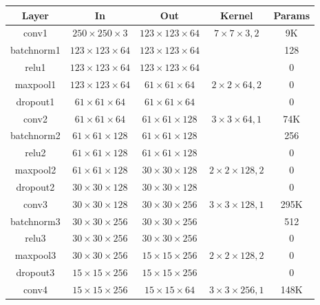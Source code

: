 \documentclass{article}
\newcommand{\B}[1]{\textbf{#1}}
\begin{document}
\begin{sloppypar}
    \begin{center}
        \begin{table}[!h]
            \begin{tabular}{|c|c|c|c|c|}
                \hline
                \B{Layer} & \B{In} & \B{Out} & \B{Kernel} & \B{Params}\\
                \hline \hline
                conv1 & $250\times 250\times 3$ & $123\times 123\times 64$ & $7\times 7\times 3, 2$ & 9K\\
                batchnorm1 & $123\times 123\times 64$ & $123\times 123\times 64$ & & 128\\
                relu1 & $123\times 123\times 64$ & $123\times 123\times 64$ & & 0\\
                maxpool1 & $123\times 123\times 64$ & $61\times 61\times 64$ & $2\times 2\times 64, 2$ & 0\\
                dropout1 & $61\times 61\times 64$ & $61\times 61\times 64$ & & 0\\
                \hline
                conv2 & $61\times 61\times 64$ & $61\times 61\times 128$ & $3\times 3\times 64, 1$ & 74K\\
                batchnorm2 & $61\times 61\times 128$ & $61\times 61\times 128$ & & 256\\
                relu2 & $61\times 61\times 128$ & $61\times 61\times 128$ & & 0\\
                maxpool2 & $61\times 61\times 128$ & $30\times 30\times 128$ & $2\times 2\times 128, 2$ & 0\\
                dropout2 & $30\times 30\times 128$ & $30\times 30\times 128$ & & 0\\
                \hline
                conv3 & $30\times 30\times 128$ & $30\times 30\times 256$ & $3\times 3\times 128, 1$ & 295K\\
                batchnorm3 & $30\times 30\times 256$ & $30\times 30\times 256$ & & 512\\
                relu3 & $30\times 30\times 256$ & $30\times 30\times 256$ & & 0\\
                maxpool3 & $30\times 30\times 256$ & $15\times 15\times 256$ & $2\times 2\times 128, 2$ & 0\\
                dropout3 & $15\times 15\times 256$ & $15\times 15\times 256$ & & 0\\
                \hline
                conv4 & $15\times 15\times 256$ & $15\times 15\times 64$ & $3\times 3\times 256, 1$ & 148K\\

\end{tabular}
\end{table}
\end{center}
\end{sloppypar}
\end{document}
